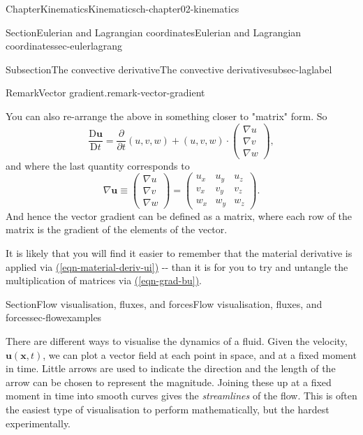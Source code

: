 \documentclass[oneside,10pt,]{book}
\newcommand{\xreffont}{\relax}
\numberwithin{equation}{section}
\newcommand{\DD}[2]{\frac{\mathrm{D}#1}{\mathrm{D}#2}}
\newcommand{\pd}[2]{\frac{\partial#1}{\partial#2}}
\newcommand{\bx}{\boldsymbol{x}}
\newcommand{\bu}{\boldsymbol{u}}
\begin{document}
\begin{chapterptx}{Chapter}{Kinematics}{}{Kinematics}{}{}{ch-chapter02-kinematics}
\begin{sectionptx}{Section}{Eulerian and Lagrangian coordinates}{}{Eulerian and Lagrangian coordinates}{}{}{sec-eulerlagrang}
\begin{subsectionptx}{Subsection}{The convective derivative}{}{The convective derivative}{}{}{subsec-laglabel}
\begin{remark}{Remark}{Vector gradient.}{remark-vector-gradient}
%
\par
You can also re-arrange the above in something closer to "matrix" form. So%
\begin{equation*}
\DD{\bu}{t} = \pd{}{t}(u, v, w) + (u, v, w) \cdot \begin{pmatrix} \nabla u \\ \nabla v \\
\nabla w\end{pmatrix},
\end{equation*}
and where the last quantity corresponds to%
\begin{equation}
\nabla \bu \equiv \begin{pmatrix} \nabla u \\ \nabla v \\ \nabla w\end{pmatrix} =
\begin{pmatrix}
u_x & u_y & u_z \\
v_x & v_y & v_z \\
w_x & w_y & w_z
\end{pmatrix}.\label{eqn-grad-bu}
\end{equation}
And hence the vector gradient can be defined as a matrix, where each row of the matrix is the gradient of the elements of the vector.%
\par
It is likely that you will find it easier to remember that the material derivative is applied via \hyperref[eqn-material-deriv-ui]{({\xreffont\ref{eqn-material-deriv-ui}})} -{}-{} than it is for you to try and untangle the multiplication of matrices via \hyperref[eqn-grad-bu]{({\xreffont\ref{eqn-grad-bu}})}.%
\end{remark}
\end{subsectionptx}
\end{sectionptx}
%
%
\typeout{************************************************}
\typeout{************************************************}
%
\begin{sectionptx}{Section}{Flow visualisation, fluxes, and forces}{}{Flow visualisation, fluxes, and forces}{}{}{sec-flowexamples}
\begin{introduction}{}%
There are different ways to visualise the dynamics of a fluid. Given the velocity, \(\bu(\bx,
t)\), we can plot a vector field at each point in space, and at a fixed moment in time. Little arrows are used to indicate the direction and the length of the arrow can be chosen to represent the magnitude. Joining these up at a fixed moment in time into smooth curves gives the \emph{streamlines} of the flow. This is often the easiest type of visualisation to perform mathematically, but the hardest experimentally.%

\end{introduction}
\end{sectionptx}
\end{chapterptx}
\end{document}
